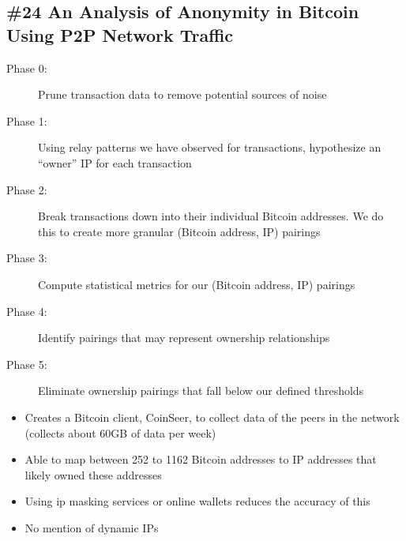 \subsection*{\#24 An Analysis of Anonymity in Bitcoin Using P2P Network Traffic}
\begin{description}
	\item[Phase 0:] Prune transaction data to remove potential sources of noise
	\item[Phase 1:] Using relay patterns we have observed for transactions, hypothesize an ``owner'' IP for each transaction
	\item[Phase 2:] Break transactions down into their individual Bitcoin addresses. We do this to create more granular (Bitcoin address, IP) pairings
	\item[Phase 3:] Compute statistical metrics for our (Bitcoin address, IP) pairings
	\item[Phase 4:] Identify pairings that may represent ownership relationships
	\item[Phase 5:] Eliminate ownership pairings that fall below our defined thresholds
\end{description}
\begin{itemize}
	\item Creates a Bitcoin client, CoinSeer, to collect data of the peers in the network (collects about 60GB of data per week)
	\item Able to map between 252 to 1162 Bitcoin addresses to IP addresses that likely owned these addresses
	\item Using ip masking services or online wallets reduces the accuracy of this
	\item No mention of dynamic IPs
\end{itemize}